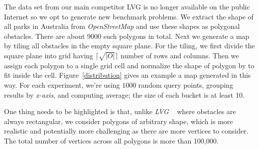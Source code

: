 The data set from our main competitor LVG\cite{zhang2004spatial}
is no longer available on the public Internet so we opt to generate new benchmark problems.
We extract the shape of all parks in Australia from \textit{OpenStreetMap}\cite{OpenStreetMap} and
use these shapes as polygonal obstacles. There are about 9000 such polygons in total.
Next we generate a map by tiling all obstacles in the empty square plane.
For the tiling, we first divide the square plane into grid having $\lceil\sqrt{|O|}\rceil$ number of rows and columns.
Then we assign each polygon to a single grid cell and normalize the shape of polygon by to fit inside the cell.
Figure~\ref{distribution} gives an example a map generated in this way.
For each experiment, we're using $1000$ random query points, grouping results by
\textit{x-axis}, and computing average; the size of each bucket is at least 10. 

One thing needs to be highlighted is that,
unlike \textit{LVG} ~\cite{zhang2004spatial} where obstacles are always rectangular,
we consider polygons of arbitrary shape, which is more realistic and potentially more challenging as there are more vertices to consider.
The total number of vertices across all polygons is more than 100,000. 

